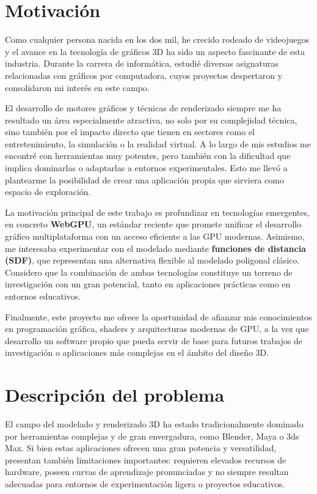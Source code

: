 \section{Motivación}

Como cualquier persona nacida en los dos mil, he crecido rodeado de videojuegos y el avance en la tecnología de gráficos 3D ha sido un aspecto fascinante de esta industria. 
Durante la carrera de informática, estudié diversas asignaturas relacionadas con gráficos por computadora, cuyos proyectos despertaron y consolidaron mi interés en este campo.

El desarrollo de motores gráficos y técnicas de renderizado siempre me ha resultado un área especialmente atractiva, no solo por su complejidad técnica, 
sino también por el impacto directo que tienen en sectores como el entretenimiento, la simulación o la realidad virtual. A lo largo de mis estudios me encontré con herramientas muy potentes, 
pero también con la dificultad que implica dominarlas o adaptarlas a entornos experimentales. Esto me llevó a plantearme la posibilidad de crear una aplicación propia que sirviera 
como espacio de exploración.

La motivación principal de este trabajo es profundizar en tecnologías emergentes, en concreto \textbf{WebGPU}, un estándar reciente que promete unificar el desarrollo gráfico multiplataforma 
con un acceso eficiente a las GPU modernas. Asimismo, me interesaba experimentar con el modelado mediante \textbf{funciones de distancia (SDF)}, que representan una alternativa flexible al 
modelado poligonal clásico. Considero que la combinación de ambas tecnologías constituye un terreno de investigación con un gran potencial, tanto en aplicaciones prácticas como en entornos 
educativos.

Finalmente, este proyecto me ofrece la oportunidad de afianzar mis conocimientos en programación gráfica, shaders y arquitecturas modernas de GPU, a la vez que desarrollo un software propio 
que pueda servir de base para futuros trabajos de investigación o aplicaciones más complejas en el ámbito del diseño 3D.

\section{Descripción del problema}

El campo del modelado y renderizado 3D ha estado tradicionalmente dominado por herramientas complejas y de gran envergadura, como Blender, Maya o 3ds Max. Si bien estas aplicaciones 
ofrecen una gran potencia y versatilidad, presentan también limitaciones importantes: requieren elevados recursos de hardware, poseen curvas de aprendizaje pronunciadas y no siempre resultan 
adecuadas para entornos de experimentación ligera o proyectos educativos.


